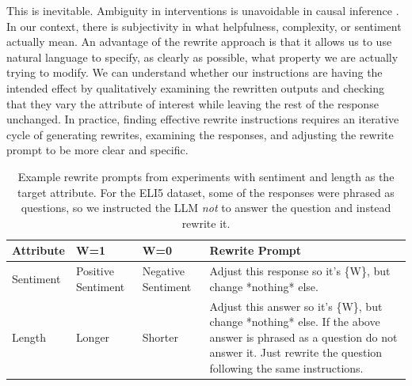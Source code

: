 \documentclass{article}
\begin{document}
This is inevitable. Ambiguity in interventions is unavoidable in causal inference \citep{hernan2016does}. In our context, there is subjectivity in what helpfulness, complexity, or sentiment actually mean.
An advantage of the rewrite approach is that it allows us to use natural language to specify, as clearly as possible, what property we are actually trying to modify. We can understand whether our instructions are having the intended effect by qualitatively examining the rewritten outputs and checking that they vary the attribute of interest while leaving the rest of the response unchanged.
In practice, finding effective rewrite instructions requires an iterative cycle of generating rewrites, examining the responses, and adjusting the rewrite prompt to be more clear and specific.

\begin{table}[t]
  \centering
  \small
  \renewcommand{\arraystretch}{1.25}
  \begin{tabular}{|p{1.5cm}|p{2.5cm}|p{2.5cm}|p{4cm}|}
  \hline
  \textbf{Attribute} & \textbf{W=1} & \textbf{W=0} & \textbf{Rewrite Prompt} \\
  \hline
  Sentiment & Positive Sentiment & Negative Sentiment & Adjust this response so it's \{W\}, but change *nothing* else. \\
  \hline
  Length & Longer & Shorter & Adjust this answer so it's \{W\}, but change *nothing* else. If the above answer is phrased as a question do not answer it. Just rewrite the question following the same instructions. \\
  \hline
  \end{tabular}
  \caption{Example rewrite prompts from experiments with sentiment and length as the target attribute. For the ELI5 dataset, some of the responses were phrased as questions, so we instructed the LLM \emph{not} to answer the question and instead rewrite it.}
  \label{tab:rewrite_prompts}
\end{table}
\end{document}
